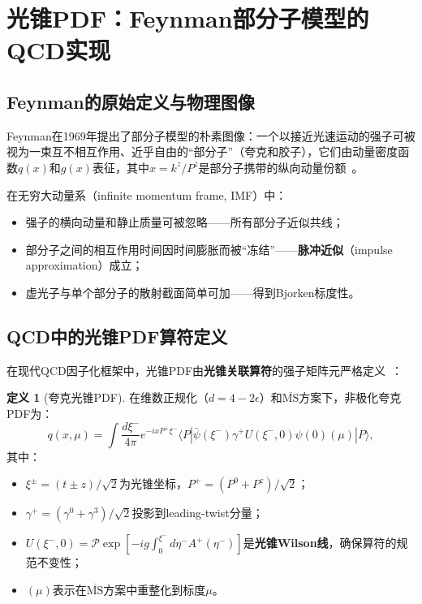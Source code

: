 \documentclass[12pt,a4paper]{ctexart}
\theoremstyle{definition}
\newtheorem{definition}{定义}[section]
\begin{document}
\section{光锥PDF：Feynman部分子模型的QCD实现}

\subsection{Feynman的原始定义与物理图像}

Feynman在1969年提出了部分子模型的朴素图像：一个以接近光速运动的强子可被视为一束互不相互作用、近乎自由的``部分子''（夸克和胶子），它们由动量密度函数$q(x)$和$g(x)$表征，其中$x = k^z/P^z$是部分子携带的纵向动量份额~\cite{PeskinSchroeder1995}。

在无穷大动量系（infinite momentum frame, IMF）中：
\begin{itemize}[nosep]
    \item 强子的横向动量和静止质量可被忽略——所有部分子近似共线；
    \item 部分子之间的相互作用时间因时间膨胀而被``冻结''——\textbf{脉冲近似}（impulse approximation）成立；
    \item 虚光子与单个部分子的散射截面简单可加——得到Bjorken标度性。
\end{itemize}

\subsection{QCD中的光锥PDF算符定义}

在现代QCD因子化框架中，光锥PDF由\textbf{光锥关联算符}的强子矩阵元严格定义~\cite{Izubuchi2018,Collins2011foundations}：

\begin{definition}[夸克光锥PDF]
在维数正规化（$d = 4-2\epsilon$）和$\overline{\text{MS}}$方案下，非极化夸克PDF为：
\begin{equation}
\boxed{q(x, \mu) = \int \frac{d\xi^-}{4\pi} e^{-ixP^+\xi^-} \langle P | \bar\psi(\xi^-) \gamma^+ U(\xi^-, 0) \psi(0)(\mu) | P \rangle},
\label{eq:LC_PDF_quark}
\end{equation}
其中：
\begin{itemize}[nosep]
    \item $\xi^\pm = (t \pm z)/\sqrt{2}$为光锥坐标，$P^+ = (P^0 + P^z)/\sqrt{2}$；
    \item $\gamma^+ = (\gamma^0 + \gamma^3)/\sqrt{2}$投影到leading-twist分量；
    \item $U(\xi^-, 0) = \mathcal{P}\exp[-ig\int_0^{\xi^-} d\eta^- A^+(\eta^-)]$是\textbf{光锥Wilson线}，确保算符的规范不变性；
    \item $(\mu)$表示在$\overline{\text{MS}}$方案中重整化到标度$\mu$。
\end{itemize}
\end{definition}
\end{document}
